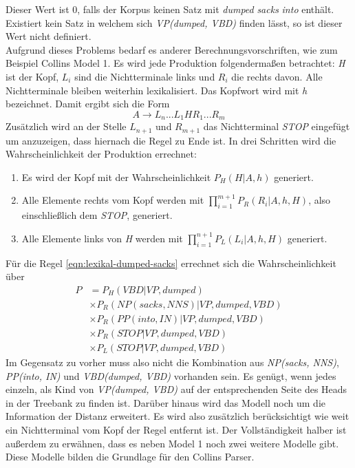 Dieser Wert ist 0, falls der Korpus keinen Satz mit \textit{dumped} \textit{sacks} \textit{into} enthält. Existiert kein Satz in welchem sich \textit{VP(dumped, VBD)} finden lässt, so ist dieser Wert nicht definiert. \\
Aufgrund dieses Problems bedarf es anderer Berechnungsvorschriften, wie zum Beispiel Collins Model 1. %
Es wird jede Produktion folgendermaßen betrachtet: \textit{H} ist der Kopf, \( L_i \) sind die Nichtterminale links und \( R_i \) die rechts davon. Alle Nichtterminale bleiben weiterhin lexikalisiert. Das Kopfwort wird mit \textit{h} bezeichnet. Damit ergibt sich die Form
\[ A \to L_n...L_1 H R_1...R_m \]
Zusätzlich wird an der Stelle \( L_{n+1} \) und \( R_{m+1} \) das Nichtterminal \textit{STOP} eingefügt um anzuzeigen, dass hiernach die Regel zu Ende ist. In drei Schritten wird die Wahrscheinlichkeit der Produktion errechnet:
\begin{enumerate}
\item Es wird der Kopf mit der Wahrscheinlichkeit \( P_H(H | A, h) \) generiert.
\item Alle Elemente rechts vom Kopf werden mit \( \displaystyle\prod_{i = 1}^{m+1} P_R(R_i | A, h, H) \), also einschließlich dem \textit{STOP}, generiert.
\item Alle Elemente links von \textit{H} werden mit \( \displaystyle\prod_{i = 1}^{n+1} P_L(L_i | A, h, H) \) generiert.
\end{enumerate}
Für die Regel \ref{eqn:lexikal-dumped-sacks} errechnet sich die Wahrscheinlichkeit über
\begin{align}
P & = P_H(VBD|VP, dumped) \nonumber \\ & \times P_R(NP(sacks, NNS)|VP, dumped, VBD) \nonumber \\ & \times P_R(PP(into, IN)|VP, dumped, VBD) \nonumber \\ & \times P_R(STOP|VP, dumped, VBD) \nonumber \\ & \times P_L(STOP|VP, dumped, VBD)
\end{align}
Im Gegensatz zu vorher muss also nicht die Kombination aus \textit{NP(sacks, NNS)}, \textit{PP(into, IN)} und \textit{VBD(dumped, VBD)} vorhanden sein. Es genügt, wenn jedes einzeln, als Kind von \textit{VP(dumped, VBD)} auf der entsprechenden Seite des Heads in der Treebank zu finden ist. %
Darüber hinaus wird das Modell noch um die Information der Distanz erweitert. Es wird also zusätzlich berücksichtigt wie weit ein Nichtterminal vom Kopf der Regel entfernt ist. 
Der Vollständigkeit halber ist außerdem zu erwähnen, dass es neben Model 1 noch zwei weitere Modelle gibt. Diese Modelle bilden die Grundlage für den Collins Parser. %